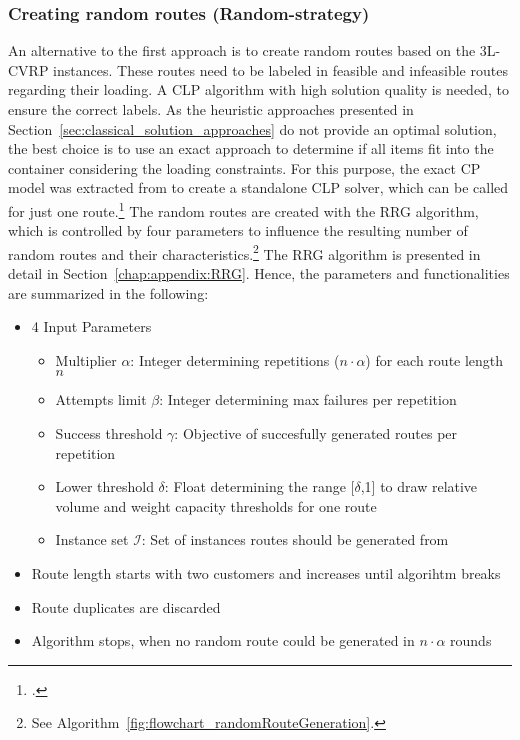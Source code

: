 \subsubsection{Creating random routes (Random-strategy)}
An alternative to the first approach is to create random routes based on the \gls{3L-CVRP} instances.
These routes need to be labeled in feasible and infeasible routes regarding their loading.
A \gls{CLP} algorithm with high solution quality is needed, to ensure the correct labels. As the heuristic approaches
presented in Section~\ref{sec:classical_solution_approaches} do not provide an optimal solution,
the best choice is to use an exact approach to determine if all items fit into the container considering the loading constraints.
For this purpose, the exact \gls{CP} model was extracted from \cite{tamke_repository_2024} to create
a standalone \gls{CLP} solver, which can be called for just one route.\footcite[cf.][]{tamke_repository_2024}
The random routes are created with the \gls{RRG} algorithm, which is controlled by four parameters to
influence the resulting number of random routes and their characteristics.\footnote{See Algorithm~\ref{fig:flowchart_randomRouteGeneration}.}
The \gls{RRG} algorithm is presented in detail in Section~\ref{chap:appendix:RRG}.
Hence, the parameters and functionalities are summarized in the following:
\begin{itemize}
    \item 4 Input Parameters
          \begin{itemize}
              \item Multiplier $\alpha$: Integer determining repetitions ($n\cdot\alpha$) for each route length $n$
              \item  Attempts limit $\beta$: Integer determining max failures per repetition
              \item  Success threshold $\gamma$: Objective of succesfully generated routes per repetition
              \item  Lower threshold $\delta$: Float determining the range [$\delta$,1] to draw relative volume and weight capacity thresholds for one route
              \item Instance set $\mathcal{I}$: Set of instances routes should be generated from
          \end{itemize}
    \item Route length starts with two customers and increases until algorihtm breaks
    \item Route duplicates are discarded
    \item Algorithm stops, when no random route could be generated in $n \cdot \alpha$ rounds
\end{itemize}

